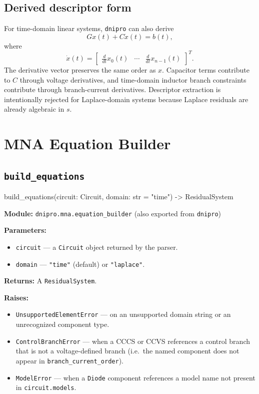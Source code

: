 \documentclass[11pt,a4paper]{article}
\newcommand{\project}{\texttt{dnipro}}
\newcommand{\code}[1]{\texttt{#1}}
\newenvironment{apisig}{%
  \begin{trivlist}\item\relax\ttfamily\small
}{%
  \end{trivlist}
}
\begin{document}
\subsection{Derived descriptor form}

For time-domain linear systems, \project{} can also derive
\begin{equation}
    Gx(t) + C\dot{x}(t) = b(t),
\end{equation}
where
\begin{equation}
    \dot{x}(t) =
    \begin{bmatrix}
        \frac{d}{dt}x_0(t) & \cdots & \frac{d}{dt}x_{n-1}(t)
    \end{bmatrix}^{T}.
\end{equation}
The derivative vector preserves the same order as \(x\). Capacitor terms
contribute to \(C\) through voltage derivatives, and time-domain inductor branch
constraints contribute through branch-current derivatives. Descriptor extraction
is intentionally rejected for Laplace-domain systems because Laplace residuals
are already algebraic in \(s\).

\section{MNA Equation Builder}
\label{sec:api-builder}

\subsection{\texttt{build\_equations}}
\label{api:build_equations}

\begin{apisig}
build\_equations(circuit: Circuit, domain: str = "time") -> ResidualSystem
\end{apisig}

\textbf{Module:} \code{dnipro.mna.equation\_builder}
(also exported from \code{dnipro})

\textbf{Parameters:}
\begin{itemize}[noitemsep]
    \item \code{circuit} --- a \code{Circuit} object returned by the parser.
    \item \code{domain} --- \code{"time"} (default) or \code{"laplace"}.
\end{itemize}

\textbf{Returns:} A \code{ResidualSystem}.

\textbf{Raises:}
\begin{itemize}[noitemsep]
    \item \code{UnsupportedElementError} --- on an unsupported domain string
          or an unrecognized component type.
    \item \code{ControlBranchError} --- when a CCCS or CCVS references a
          control branch that is not a voltage-defined branch (i.e.\ the named
          component does not appear in \code{branch\_current\_order}).
    \item \code{ModelError} --- when a \code{Diode} component references a
          model name not present in \code{circuit.models}.
\end{itemize}
\end{document}
